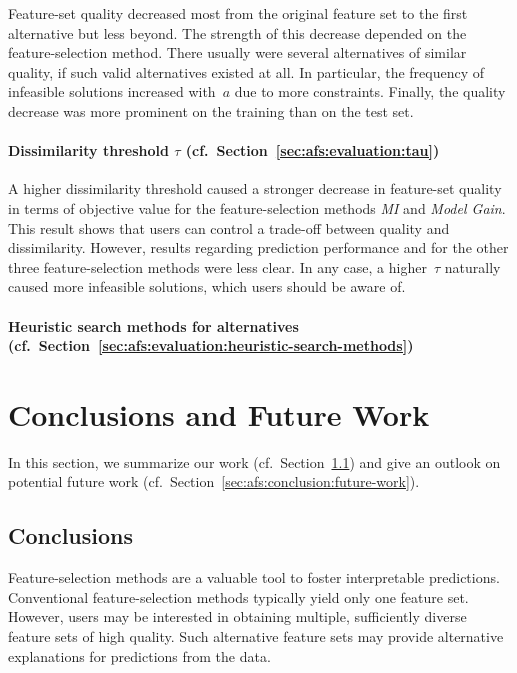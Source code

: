 \documentclass{article}
\theoremstyle{definition}
\begin{document}
Feature-set quality decreased most from the original feature set to the first alternative but less beyond.
The strength of this decrease depended on the feature-selection method.
There usually were several alternatives of similar quality, if such valid alternatives existed at all.
In particular, the frequency of infeasible solutions increased with~$a$ due to more constraints.
Finally, the quality decrease was more prominent on the training than on the test set.

\paragraph{Dissimilarity threshold $\tau$ (cf.~Section~\ref{sec:afs:evaluation:tau})}

A higher dissimilarity threshold caused a stronger decrease in feature-set quality in terms of objective value for the feature-selection methods \emph{MI} and \emph{Model Gain}.
This result shows that users can control a trade-off between quality and dissimilarity.
However, results regarding prediction performance and for the other three feature-selection methods were less clear.
In any case, a higher~$\tau$ naturally caused more infeasible solutions, which users should be aware of.

\paragraph{Heuristic search methods for alternatives (cf.~Section~\ref{sec:afs:evaluation:heuristic-search-methods})}


\section{Conclusions and Future Work}
\label{sec:afs:conclusion}

In this section, we summarize our work (cf.~Section~\ref{sec:afs:conclusion:conclusion}) and give an outlook on potential future work (cf.~Section~\ref{sec:afs:conclusion:future-work}).

\subsection{Conclusions}
\label{sec:afs:conclusion:conclusion}

Feature-selection methods are a valuable tool to foster interpretable predictions.
Conventional feature-selection methods typically yield only one feature set.
However, users may be interested in obtaining multiple, sufficiently diverse feature sets of high quality.
Such alternative feature sets may provide alternative explanations for predictions from the data.
\end{document}
